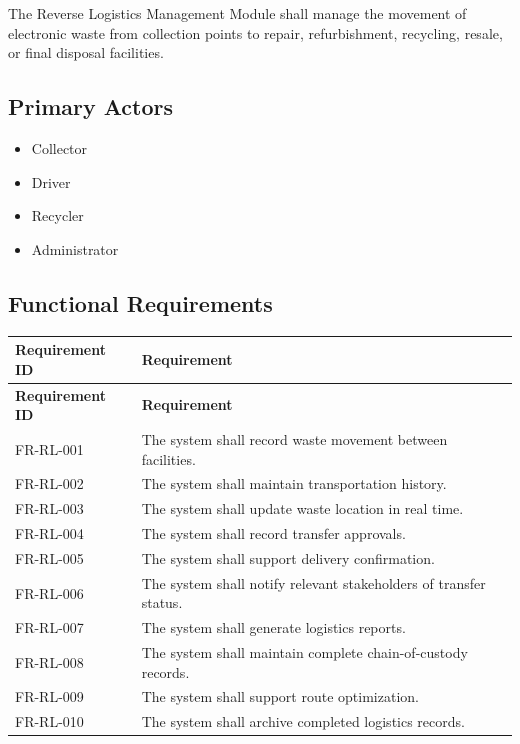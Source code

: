 The Reverse Logistics Management Module shall manage the movement of
electronic waste from collection points to repair, refurbishment,
recycling, resale, or final disposal facilities.

\subsection{Primary Actors}

\begin{itemize}
\item Collector
\item Driver
\item Recycler
\item Administrator
\end{itemize}

\subsection{Functional Requirements}

\begin{longtable}{|p{3cm}|p{10.2cm}|}

\hline
\textbf{Requirement ID} &
\textbf{Requirement}\\
\hline
\endfirsthead

\hline
\textbf{Requirement ID} &
\textbf{Requirement}\\
\hline
\endhead

FR-RL-001 &
The system shall record waste movement between facilities.\\
\hline

FR-RL-002 &
The system shall maintain transportation history.\\
\hline

FR-RL-003 &
The system shall update waste location in real time.\\
\hline

FR-RL-004 &
The system shall record transfer approvals.\\
\hline

FR-RL-005 &
The system shall support delivery confirmation.\\
\hline

FR-RL-006 &
The system shall notify relevant stakeholders of transfer status.\\
\hline

FR-RL-007 &
The system shall generate logistics reports.\\
\hline

FR-RL-008 &
The system shall maintain complete chain-of-custody records.\\
\hline

FR-RL-009 &
The system shall support route optimization.\\
\hline

FR-RL-010 &
The system shall archive completed logistics records.\\
\hline

\end{longtable}

